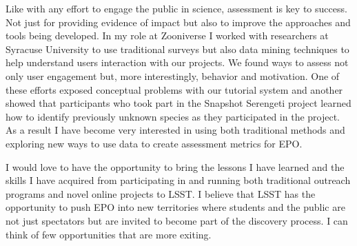 \documentclass[11pt,a4paper,sans]{moderncv}        %
\begin{document}
Like with any effort to engage the public in science, assessment is key to success. Not just for providing evidence of impact but also to improve the approaches and tools being developed. In my role at Zooniverse I worked with researchers at Syracuse University to use traditional surveys but also data mining techniques to help understand users interaction with our projects. We found ways to assess not only user engagement but, more interestingly,  behavior and motivation. One of these efforts exposed conceptual problems with our tutorial system and another showed that participants who took part in the Snapshot Serengeti project learned how to identify previously unknown species as they participated in the project. As a result I have become very interested in using both traditional methods and exploring new ways to use data to create assessment metrics for EPO.

I would love to have the opportunity to bring the lessons I have learned and the skills I have acquired from participating in and running both traditional outreach programs and novel online projects to LSST. I believe that LSST has the opportunity to push EPO into new territories where students and the public are not just spectators but are invited to become part of the discovery process. I can think of few opportunities that are more exiting. 
\end{document}
